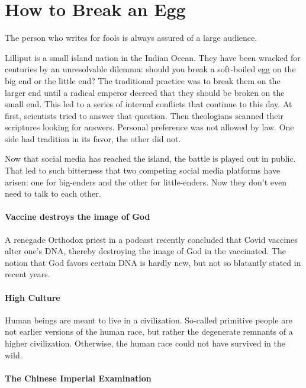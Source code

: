 \section{How to Break an Egg}

\begin{quotex}
The person who writes for fools is always assured of a large audience.
\end{quotex}

Lilliput is a small island nation in the Indian Ocean. They have been wracked for centuries by an unresolvable dilemma: should you break a soft-boiled egg on the big end or the little end? The traditional practice was to break them on the larger end until a radical emperor decreed that they should be broken on the small end. This led to a series of internal conflicts that continue to this day. At first, scientists tried to answer that question. Then theologians scanned their scriptures looking for answers. Personal preference was not allowed by law. One side had tradition in its favor, the other did not.

Now that social media has reached the island, the battle is played out in public. That led to such bitterness that two competing social media platforms have arisen: one for big-enders and the other for little-enders. Now they don't even need to talk to each other.

\paragraph{Vaccine destroys the image of God}


A renegade Orthodox priest in a podcast recently concluded that Covid vaccines alter one's DNA, thereby destroying the image of God in the vaccinated. The notion that God favors certain DNA is hardly new, but not so blatantly stated in recent years.

\paragraph{High Culture}


Human beings are meant to live in a civilization. So-called primitive people are not earlier versions of the human race, but rather the degenerate remnants of a higher civilization. Otherwise, the human race could not have survived in the wild.

\paragraph{The Chinese Imperial Examination}


